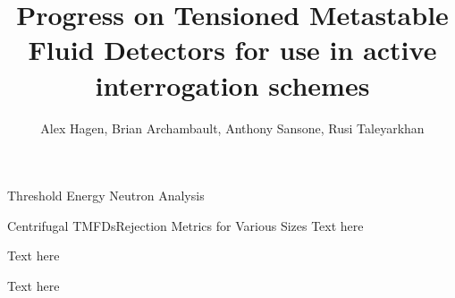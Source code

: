 

\title{Progress on Tensioned Metastable Fluid Detectors for use in active
       interrogation schemes}
\author{Alex Hagen, Brian Archambault,
        Anthony Sansone, Rusi Taleyarkhan}
\renewcommand{\today}{July 3, 2016}
\maketitle
\begin{cell}{6}{12}{Threshold Energy Neutron Analysis}{}
  \begin{cell}{2}{2}{Centrifugal TMFDs}{Rejection Metrics for Various Sizes}
    Text here
  \end{cell}%
  \begin{cell}{2}{2}{}{}
    Text here
  \end{cell}%
  \begin{cell}{2}{2}{}{}
    Text here
  \end{cell}%
\end{cell}%

